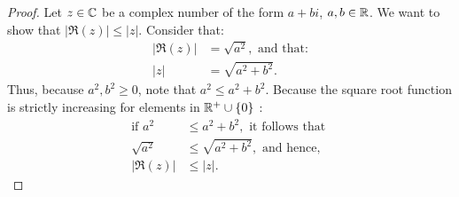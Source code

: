 \begin{enumerate}
    \begin{proof}
        Let $z\in\mathbb{C}$ be a complex number of the form $a + bi$, $a, b \in \mathbb{R}$. We want to show that $|\Re(z)|\le |z|$.\gline{}
        Consider that:
        \begin{align*}
            |\Re(z)|&= \sqrt{a^2}, \text{ and that:}\\
            |z|&= \sqrt{a^2 + b^2}.
        \end{align*}
        Thus, because $a^2, b^2 \ge 0$, note that $a^2 \le a^2 + b^2$. Because the square root function is strictly increasing for elements in $\mathbb{R}^+\cup \{0\}$ :
        \begin{align*}
            \text{if } a^2 &\le a^2 + b^2,\text{ it follows that }\\
            \sqrt{a^2} &\le \sqrt{a^2 + b^2}, \text{ and hence, }\\
            |\Re(z)| &\le |z| .
        \end{align*}
    \end{proof}
	\pagebreak





\end{enumerate}
